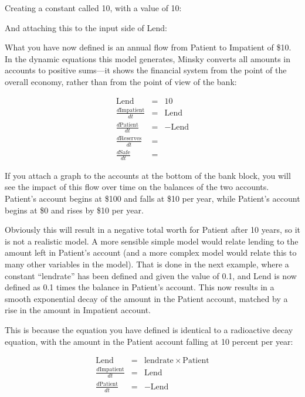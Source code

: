 Creating a constant called 10, with a value of 10:


And attaching this to the input side of Lend:



What you have now defined is an annual flow from Patient to Impatient
of \$10. In the dynamic equations this model generates, Minsky
converts all amounts in accounts to positive sums---it shows the
financial system from the point of the overall economy, rather than
from the point of view of the bank:

\begin{eqnarray*}
\mathrm{Lend}&=&10\\
\frac{d\mathrm{Impatient}}{dt}&=&\mathrm{Lend}\\
\frac{d\mathrm{Patient}}{dt}&=&-\mathrm{Lend}\\
\frac{d\mathrm{Reserves}}{dt}&=&\\
\frac{d\mathrm{Safe}}{dt}&=&
\end{eqnarray*}



If you attach a graph to the accounts at the bottom of the bank block,
you will see the impact of this flow over time on the balances of the
two accounts. Patient's account begins at \$100 and falls at \$10 per
year, while Patient's account begins at \$0 and rises by \$10 per
year.



Obviously this will result in a negative total worth for Patient after
10 years, so it is not a realistic model. A more sensible simple model
would relate lending to the amount left in Patient's account (and a
more complex model would relate this to many other variables in the
model). That is done in the next example, where a constant ``lendrate''
has been defined and given the value of 0.1, and Lend is now defined
as 0.1 times the balance in Patient's account. This now results in a
smooth exponential decay of the amount in the Patient account, matched
by a rise in the amount in Impatient account.



This is because the equation you have defined is identical to a
radioactive decay equation, with the amount in the Patient account
falling at 10 percent per year:

\begin{eqnarray*}
\mathrm{Lend}&=&\mathrm{lendrate}\times\mathrm{Patient}\\
\frac{d\mathrm{Impatient}}{dt}&=&\mathrm{Lend}\\
\frac{d\mathrm{Patient}}{dt}&=&-\mathrm{Lend}\\
\end{eqnarray*}

